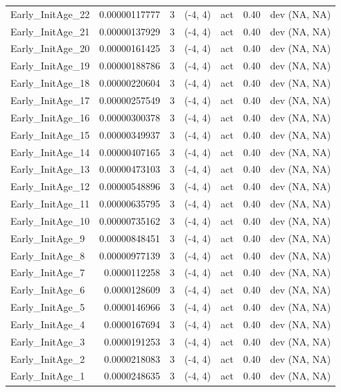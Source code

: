 \documentclass[12pt,]{article}
\begin{document}
\begin{landscape}
\begin{longtable}{lrcccll}
  Early\_InitAge\_22 & 0.00000117777 & 3 & (-4, 4) & act & 0.40 & dev (NA, NA) \\ 
  Early\_InitAge\_21 & 0.00000137929 & 3 & (-4, 4) & act & 0.40 & dev (NA, NA) \\ 
  Early\_InitAge\_20 & 0.00000161425 & 3 & (-4, 4) & act & 0.40 & dev (NA, NA) \\ 
  Early\_InitAge\_19 & 0.00000188786 & 3 & (-4, 4) & act & 0.40 & dev (NA, NA) \\ 
  Early\_InitAge\_18 & 0.00000220604 & 3 & (-4, 4) & act & 0.40 & dev (NA, NA) \\ 
  Early\_InitAge\_17 & 0.00000257549 & 3 & (-4, 4) & act & 0.40 & dev (NA, NA) \\ 
  Early\_InitAge\_16 & 0.00000300378 & 3 & (-4, 4) & act & 0.40 & dev (NA, NA) \\ 
  Early\_InitAge\_15 & 0.00000349937 & 3 & (-4, 4) & act & 0.40 & dev (NA, NA) \\ 
  Early\_InitAge\_14 & 0.00000407165 & 3 & (-4, 4) & act & 0.40 & dev (NA, NA) \\ 
  Early\_InitAge\_13 & 0.00000473103 & 3 & (-4, 4) & act & 0.40 & dev (NA, NA) \\ 
  Early\_InitAge\_12 & 0.00000548896 & 3 & (-4, 4) & act & 0.40 & dev (NA, NA) \\ 
  Early\_InitAge\_11 & 0.00000635795 & 3 & (-4, 4) & act & 0.40 & dev (NA, NA) \\ 
  Early\_InitAge\_10 & 0.00000735162 & 3 & (-4, 4) & act & 0.40 & dev (NA, NA) \\ 
  Early\_InitAge\_9 & 0.00000848451 & 3 & (-4, 4) & act & 0.40 & dev (NA, NA) \\ 
  Early\_InitAge\_8 & 0.00000977139 & 3 & (-4, 4) & act & 0.40 & dev (NA, NA) \\ 
  Early\_InitAge\_7 & 0.0000112258 & 3 & (-4, 4) & act & 0.40 & dev (NA, NA) \\ 
  Early\_InitAge\_6 & 0.0000128609 & 3 & (-4, 4) & act & 0.40 & dev (NA, NA) \\ 
  Early\_InitAge\_5 & 0.0000146966 & 3 & (-4, 4) & act & 0.40 & dev (NA, NA) \\ 
  Early\_InitAge\_4 & 0.0000167694 & 3 & (-4, 4) & act & 0.40 & dev (NA, NA) \\ 
  Early\_InitAge\_3 & 0.0000191253 & 3 & (-4, 4) & act & 0.40 & dev (NA, NA) \\ 
  Early\_InitAge\_2 & 0.0000218083 & 3 & (-4, 4) & act & 0.40 & dev (NA, NA) \\ 
  Early\_InitAge\_1 & 0.0000248635 & 3 & (-4, 4) & act & 0.40 & dev (NA, NA) \\ 

\end{longtable}
\end{landscape}
\end{document}
